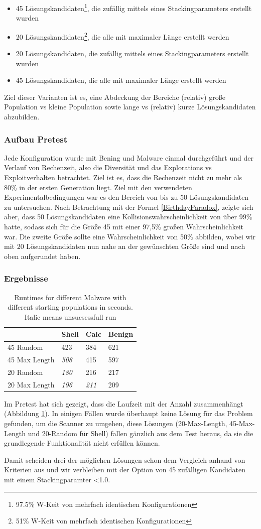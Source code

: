 \begin{itemize}
    \item 45 Lösungskandidaten\footnote{97.5\% W-Keit von mehrfach identischen Konfigurationen}, die zufällig mittels eines Stackingparameters erstellt wurden 
    \item 20 Lösungskandidaten\footnote{51\% W-Keit von mehrfach identischen Konfigurationen}, die alle mit maximaler Länge erstellt werden
    \item 20 Lösungskandidaten, die zufällig mittels eines Stackingparameters erstellt wurden
    \item 45 Lösungskandidaten, die alle mit maximaler Länge erstellt werden
\end{itemize}
Ziel dieser Varianten ist es, eine Abdeckung der Bereiche (relativ) große Population vs kleine Population sowie lange vs (relativ) kurze Lösungskandidaten abzubilden.
\subsubsection{Aufbau Pretest}
Jede Konfiguration wurde mit Bening und Malware einmal durchgeführt und der Verlauf von Rechenzeit, also die Diversität und das Explorations vs Exploitverhalten betrachtet. Ziel ist es, dass die Rechenzeit nicht zu mehr als 80\% in der ersten Generation liegt. Ziel mit den verwendeten Experimentalbedingungen war es den Bereich von bis zu 50 Lösungskandidaten zu untersuchen. Nach Betrachtung mit der Formel \ref{BirthdayParadox}, zeigte sich aber, dass 50 Lösungskandidaten eine Kollisionswahrscheinlichkeit von über 99\% hatte, sodass sich für die Größe 45 mit einer 97,5\% großen Wahrscheinlichkeit war. Die zweite Größe sollte eine Wahrscheinlichkeit von 50\% abbilden, wobei wir mit 20 Lösungskandidaten nun nahe an der gewünschten Größe sind und nach oben aufgerundet haben.
\subsubsection{Ergebnisse}
\begin{table}[]
\begin{tabular}{@{}llll@{}}
\toprule
              & Shell        & Calc & Benign \\ \midrule
45 Random     & 423          & 384  & 621    \\
45 Max Length     & \textit{508} & 415  & 597    \\
20 Random     & \textit{180} & 216  & 217    \\
20 Max Length & \textit{196} & \textit{211}  & 209    \\ \bottomrule
\end{tabular}
\caption{Runtimes for different Malware with different starting populations in seconds. Italic means unsucsessfull run}
\label{Pretest_Inital}
\end{table}
Im Pretest hat sich gezeigt, dass die Laufzeit mit der Anzahl zusammenhängt (Abbildung \ref{Pretest_Inital}). In einigen Fällen wurde überhaupt keine Lösung für das Problem gefunden, um die Scanner zu umgehen, diese Lösungen (20-Max-Length, 45-Max-Length und 20-Random für Shell) fallen gänzlich aus dem Test heraus, da sie die grundlegende Funktionalität nicht erfüllen können.

Damit scheiden drei der möglichen Lösungen schon dem Vergleich anhand von Kriterien aus und wir verbleiben mit der Option von 45 zufälligen Kandidaten mit einem Stackingparamter <1.0.
